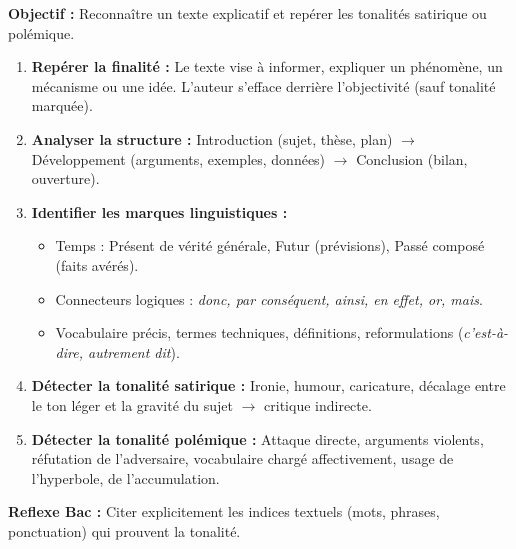 \documentclass[11pt]{article}
\newcommand{\cle}[1]{{\popxbold\color{popdark}#1}}
\begin{document}
\begin{methode}
    \textbf{Objectif :} Reconnaître un texte explicatif et repérer les tonalités satirique ou polémique.
    \begin{enumerate}
        \item \textbf{Repérer la finalité :} Le texte vise à \cle{informer}, \cle{expliquer} un phénomène, un mécanisme ou une idée. L'auteur s'efface derrière l'objectivité (sauf tonalité marquée).
        \item \textbf{Analyser la structure :} Introduction (sujet, thèse, plan) $\rightarrow$ Développement (arguments, exemples, données) $\rightarrow$ Conclusion (bilan, ouverture).
        \item \textbf{Identifier les marques linguistiques :}
            \begin{itemize}
                \item Temps : Présent de vérité générale, Futur (prévisions), Passé composé (faits avérés).
                \item Connecteurs logiques : \emph{donc, par conséquent, ainsi, en effet, or, mais}.
                \item Vocabulaire précis, termes techniques, définitions, reformulations (\emph{c'est-à-dire, autrement dit}).
            \end{itemize}
        \item \textbf{Détecter la tonalité satirique :} Ironie, humour, caricature, décalage entre le ton léger et la gravité du sujet $\rightarrow$ critique indirecte.
        \item \textbf{Détecter la tonalité polémique :} Attaque directe, arguments violents, réfutation de l'adversaire, vocabulaire chargé affectivement, usage de l'hyperbole, de l'accumulation.
    \end{enumerate}
    \textbf{Reflexe Bac :} Citer explicitement les indices textuels (mots, phrases, ponctuation) qui prouvent la tonalité.
\end{methode}
\end{document}
